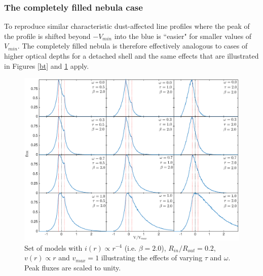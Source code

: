 


\subsubsection{The completely filled nebula case}

To reproduce similar characteristic dust-affected line profiles where the peak of the profile is shifted beyond $-V_{min}$ into the blue is ``easier" for smaller values of $V_{min}$.  The completely filled nebula is therefore effectively analogous to cases of higher optical depths for a detached shell and the same effects that are illustrated in Figures \ref{bt} and \ref{wt} apply.


\begin{figure}
\centering
\includegraphics[trim =70 40 40 15,clip=true,scale=0.43]{chapters/chapter4/images/params/C/C_all}
\caption{Set of models with $i(r) \propto r^{-4}$ (i.e. $\beta=2.0$), $R_{in}/R_{out}=0.2$, $v(r) \propto r$  
and $v_{max}=1$ illustrating the effects of varying $\tau$ and $\omega$. 
Peak fluxes are scaled to unity.}
\label{wt}
\end{figure}


